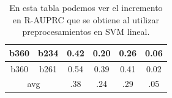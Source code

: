 \begin{table}[h!]
\begin{tabular}{|c|c|c|c|c|c|}
b360                & b234               & 0.42        & 0.20           & 0.26                   & 0.06                       \\ \hline
b360                & b261               & 0.54        & 0.39           & 0.41                   & 0.02                       \\ \hline
\multicolumn{2}{|c|}{avg}                & .38         & .24            & .29                    & {\color[HTML]{009901} .05} \\ \hline
\end{tabular}
\caption{ En esta tabla podemos ver el incremento en R-AUPRC que se obtiene al utilizar preprocesamientos en SVM lineal. }
\label{tab:linear-gain-preproc}
\end{table}

